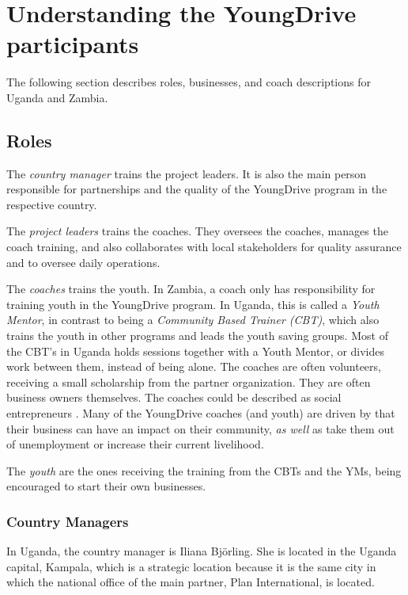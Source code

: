 \section{Understanding the YoungDrive participants}

The following section describes roles, businesses, and coach descriptions for Uganda and Zambia.

\subsection{Roles}

The \textit{country manager} trains the project leaders. It is also the main person responsible for partnerships and the quality of the YoungDrive program in the respective country.

The \textit{project leaders} trains the coaches. They oversees the coaches, manages the coach training, and also collaborates with local stakeholders for quality assurance and to oversee daily operations.

The \textit{coaches} trains the youth. In Zambia, a coach only has responsibility for training youth in the YoungDrive program. In Uganda, this is called a \textit{Youth Mentor}, in contrast to being a \textit{Community Based Trainer (CBT)}, which also trains the youth in other programs and leads the youth saving groups. Most of the CBT's in Uganda holds sessions together with a Youth Mentor, or divides work between them, instead of being alone. The coaches are often volunteers, receiving a small scholarship from the partner organization. They are often business owners themselves. The coaches could be described as social entrepreneurs \citep{mitchel}. Many of the YoungDrive coaches (and youth) are driven by that their business can have an impact on their community, \textit{as well} as take them out of unemployment or increase their current livelihood.

The \textit{youth} are the ones receiving the training from the CBTs and the YMs, being encouraged to start their own businesses.

\subsubsection{Country Managers}

In Uganda, the country manager is Iliana Björling. She is located in the Uganda capital, Kampala, which is a strategic location because it is the same city in which the national office of the main partner, Plan International, is located.

